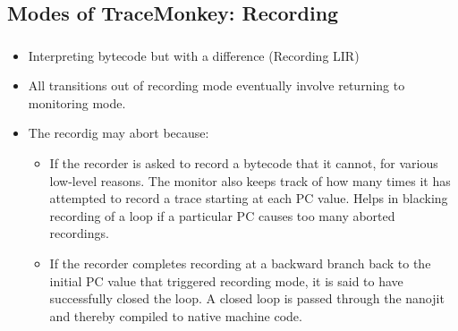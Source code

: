 \documentclass[mathserif,10pt]{beamer}
\begin{document}
\subsection{Modes of TraceMonkey: Recording}
\frame
{
  \frametitle{\subsecname}
  \begin{itemize} 
  \item Interpreting bytecode but with a difference (Recording LIR) 
  \item All transitions out of recording mode eventually involve returning to monitoring mode.  
  \item The recordig may abort because: 
    \begin{itemize} 
      \item If the recorder is asked to record a bytecode that it cannot, for various low-level reasons. 
        The monitor also keeps track of how many times it has attempted to record a trace starting at each PC value. Helps in blacking recording of a loop  if a particular PC causes too many aborted recordings.
      \item If the recorder completes recording at a backward branch back to the initial PC value that triggered recording mode, it is said to have successfully closed the loop. A closed loop is passed through the nanojit  and thereby compiled to native machine code. 

    \end{itemize}  
  \end{itemize}  
}
\end{document}
